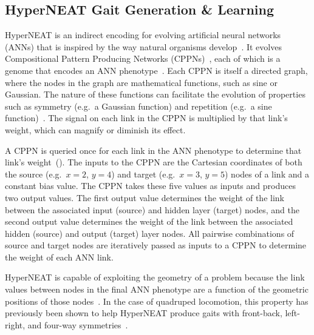 \subsection{HyperNEAT Gait Generation \& Learning}
    
HyperNEAT is an indirect encoding for evolving artificial neural
networks (ANNs) that is inspired by the way natural organisms
develop~\cite{stanley2009hypercube}. It evolves Compositional Pattern
Producing Networks (CPPNs)~\cite{stanley2007compositional}, each of
which is a genome that encodes an ANN
phenotype~\cite{stanley2009hypercube}. Each CPPN is itself a directed
graph, where the nodes in the graph are mathematical functions, such as sine or
Gaussian. The nature of these functions can facilitate the evolution
of properties such as symmetry (e.g.\ a Gaussian function) and repetition (e.g.\ a sine
function)~\cite{stanley2009hypercube, stanley2007compositional}. The
signal on each link in the CPPN is multiplied by that link's weight,
which can magnify or diminish its effect.
  
A CPPN is queried once for each link in the ANN phenotype to determine
that link's weight~(). The inputs to the CPPN are the Cartesian
coordinates of both the source (e.g.\ $x = 2$, $y = 4$) and target
(e.g.\ $x = 3$, $y = 5$) nodes of a link and a constant bias
value. The CPPN takes these five values as inputs and produces two output values. The first output value
determines the weight of the link between the associated input
(source) and hidden layer (target) nodes, and the second output value
determines the weight of the link between the associated hidden
(source) and output (target) layer nodes. All pairwise combinations of
source and target nodes are iteratively passed as inputs to a CPPN to
determine the weight of each ANN link.


HyperNEAT is capable of exploiting the geometry of a problem because
the link values between nodes in the final ANN phenotype are a
function of the geometric positions of those nodes~\cite{stanley2009hypercube, clune2009sensitivity,
  clune2011performance}. In the case of quadruped locomotion, this
property has previously been shown to help HyperNEAT produce gaits with front-back, left-right,
and four-way symmetries~\cite{clune2009evolving,
  clune2011performance}.
  
